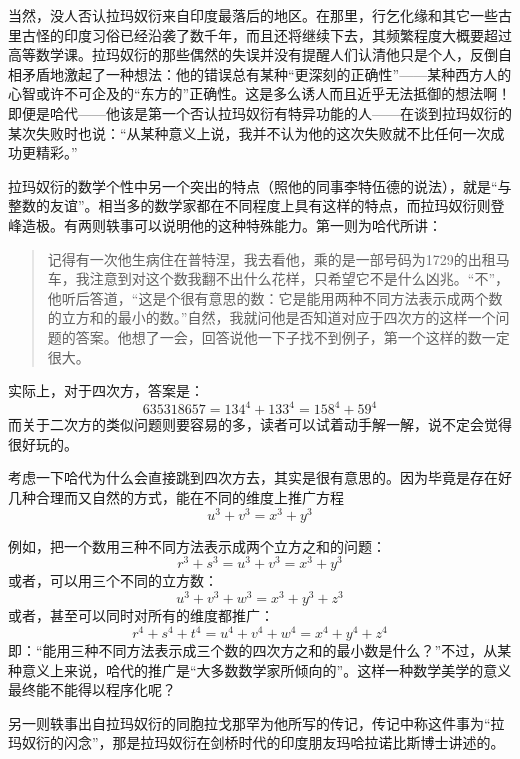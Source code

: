当然，没人否认拉玛奴衍来自印度最落后的地区。在那里，行乞化缘和其它一些古里古怪的印度习俗已经沿袭了数千年，而且还将继续下去，其频繁程度大概要超过高等数学课。拉玛奴衍的那些偶然的失误并没有提醒人们认清他只是个人，反倒自相矛盾地激起了一种想法：他的错误总有某种“更深刻的正确性”——某种西方人的心智或许不可企及的“东方的”正确性。这是多么诱人而且近乎无法抵御的想法啊！即便是哈代——他该是第一个否认拉玛奴衍有特异功能的人——在谈到拉玛奴衍的某次失败时也说：“从某种意义上说，我并不认为他的这次失败就不比任何一次成功更精彩。”

拉玛奴衍的数学个性中另一个突出的特点（照他的同事李特伍德的说法），就是“与整数的友谊”。相当多的数学家都在不同程度上具有这样的特点，而拉玛奴衍则登峰造极。有两则轶事可以说明他的这种特殊能力。第一则为哈代所讲：

\begin{quote}
记得有一次他生病住在普特涅，我去看他，乘的是一部号码为1729的出租马车，我注意到对这个数我翻不出什么花样，只希望它不是什么凶兆。“不”，他听后答道，“这是个很有意思的数：它是能用两种不同方法表示成两个数的立方和的最小的数。”自然，我就问他是否知道对应于四次方的这样一个问题的答案。他想了一会，回答说他一下子找不到例子，第一个这样的数一定很大。
\end{quote}

实际上，对于四次方，答案是：
\[
635318657=134^4+133^4=158^4+59^4
\]
而关于二次方的类似问题则要容易的多，读者可以试着动手解一解，说不定会觉得很好玩的。

考虑一下哈代为什么会直接跳到四次方去，其实是很有意思的。因为毕竟是存在好几种合理而又自然的方式，能在不同的维度上推广方程
\[
u^3+v^3=x^3+y^3
\]

例如，把一个数用三种不同方法表示成两个立方之和的问题：
\[
r^3+s^3=u^3+v^3=x^3+y^3
\]
或者，可以用三个不同的立方数：
\[
u^3+v^3+w^3=x^3+y^3+z^3
\]
或者，甚至可以同时对所有的维度都推广：
\[
r^4+s^4+t^4=u^4+v^4+w^4=x^4+y^4+z^4
\]
即：“能用三种不同方法表示成三个数的四次方之和的最小数是什么？”不过，从某种意义上来说，哈代的推广是“大多数数学家所倾向的”。这样一种数学美学的意义最终能不能得以程序化呢？

另一则轶事出自拉玛奴衍的同胞拉戈那罕为他所写的传记，传记中称这件事为“拉玛奴衍的闪念”，那是拉玛奴衍在剑桥时代的印度朋友玛哈拉诺比斯博士讲述的。

